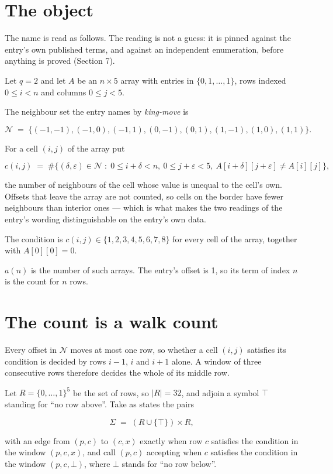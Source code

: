 \documentclass[11pt]{article}
\theoremstyle{definition}
\begin{document}
\section{The object}

The name is read as follows. The reading is not a guess: it is pinned against the entry's own published terms, and against an independent enumeration, before anything is proved (Section 7).

Let $q = 2$ and let $A$ be an $n \times 5$ array with entries in $\{0,1,\dots,1\}$, rows indexed $0 \le i < n$ and columns $0 \le j < 5$.

The neighbour set the entry names by {\itshape king-move} is

\[\mathcal{N} \;=\; \{(-1,-1), (-1,0), (-1,1), (0,-1), (0,1), (1,-1), (1,0), (1,1)\}.\]

For a cell $(i,j)$ of the array put

\[c(i,j) \;=\; \#\bigl\{(\delta,\varepsilon)\in\mathcal{N} \;:\; 0\le i+\delta<n,\ 0\le j+\varepsilon<5,\ A[i+\delta][j+\varepsilon] \neq A[i][j]\bigr\},\]

the number of neighbours of the cell whose value is unequal to the cell's own. Offsets that leave the array are not counted, so cells on the border have fewer neighbours than interior ones --- which is what makes the two readings of the entry's wording distinguishable on the entry's own data.

The condition is $c(i,j) \in \{1, 2, 3, 4, 5, 6, 7, 8\}$ for every cell of the array, together with $A[0][0]=0$.

$a(n)$ is the number of such arrays. The entry's offset is 1, so its term of index $n$ is the count for $n$ rows.

\section{The count is a walk count}

Every offset in $\mathcal{N}$ moves at most one row, so whether a cell $(i,j)$ satisfies its condition is decided by rows $i-1$, $i$ and $i+1$ alone. A window of three consecutive rows therefore decides the whole of its middle row.

Let $R = \{0,\dots,1\}^{5}$ be the set of rows, so $|R| = 32$, and adjoin a symbol $\top$ standing for ``no row above''. Take as states the pairs

\[\Sigma \;=\; (R \cup \{\top\}) \times R,\]

with an edge from $(p,c)$ to $(c,x)$ exactly when row $c$ satisfies the condition in the window $(p,c,x)$, and call $(p,c)$ accepting when $c$ satisfies the condition in the window $(p,c,\bot)$, where $\bot$ stands for ``no row below''.
\end{document}
